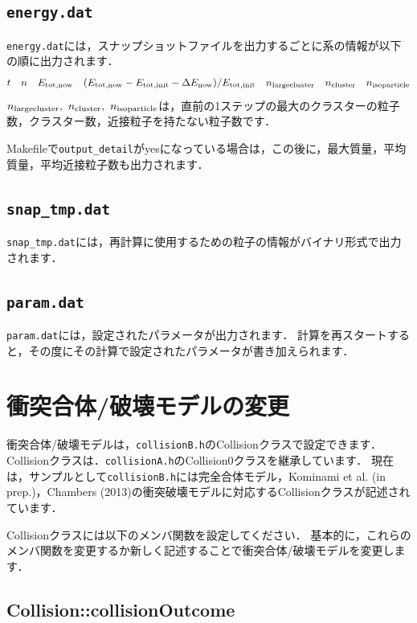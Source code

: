\documentclass[12pt,a4paper,dvipdfmx]{jsarticle}
\begin{document}

\subsection{\texttt{energy.dat}\label{outputene}}

\texttt{energy.dat}には，スナップショットファイルを出力するごとに系の情報が以下の順に出力されます．
\[
t\quad n\quad E_{\rm tot,now}\quad (E_{\rm tot, now}-E_{\rm tot, init}-\Delta E_{\rm now})/E_{\rm tot, init}\quad n_{\rm large cluater}\quad n_{\rm cluster}\quad n_{\rm iso particle}
\]
$n_{\rm large cluster},\ n_{\rm cluster},\ n_{\rm iso particle}$は，直前の1ステップの最大のクラスターの粒子数，クラスター数，近接粒子を持たない粒子数です．

Makefileで\texttt{output\_detail}がyesになっている場合は，この後に，最大質量，平均質量，平均近接粒子数も出力されます．

\subsection{\texttt{snap\_tmp.dat}}
\texttt{snap\_tmp.dat}には，再計算に使用するための粒子の情報がバイナリ形式で出力されます．


\subsection{\texttt{param.dat}}

\texttt{param.dat}には，設定されたパラメータが出力されます．
計算を再スタートすると，その度にその計算で設定されたパラメータが書き加えられます．


\section{衝突合体/破壊モデルの変更\label{collision}}

衝突合体/破壊モデルは，\texttt{collisionB.h}のCollisionクラスで設定できます．
Collisionクラスは．\texttt{collisionA.h}のCollision0クラスを継承しています．
現在は，サンプルとして\texttt{collisionB.h}には完全合体モデル，Kominami et al. (in prep.)，Chambers (2013)の衝突破壊モデルに対応するCollisionクラスが記述されています．

Collisionクラスには以下のメンバ関数を設定してください．
基本的に，これらのメンバ関数を変更するか新しく記述することで衝突合体/破壊モデルを変更します．
\subsection{Collision::collisionOutcome}
\end{document}
